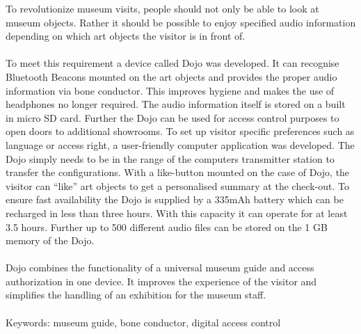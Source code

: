 To revolutionize museum visits, people should not only be able to look at museum objects. Rather it should be possible to enjoy specified audio information depending on which art objects the visitor is in front of.\\\\ To meet this requirement a device called Dojo was developed. It can recognise Bluetooth Beacons mounted on the art objects and provides the proper audio information via bone conductor. This improves hygiene and makes the use of headphones no longer required. The audio information itself is stored on a built in micro SD card. Further the Dojo can be used for access control purposes to open doors to additional showrooms. To set up visitor specific preferences such as language or access right, a user-friendly computer application was developed. The Dojo simply needs to be in the range of the computers transmitter station to transfer the configurations. With a like-button mounted on the case of Dojo, the visitor can ``like'' art objects to get a personalised summary at the check-out. To ensure fast availability the Dojo is supplied by a 335mAh battery which can be recharged in less than three hours. With this capacity it can operate for at least 3.5 hours. Further up to 500 different audio files can be stored on the 1 GB memory of the Dojo.\\\\ Dojo combines the functionality of a universal museum guide and access authorization in one device. It improves the experience of the visitor and simplifies the handling of an exhibition for the museum staff.\\\\Keywords: museum guide, bone conductor, digital access control
